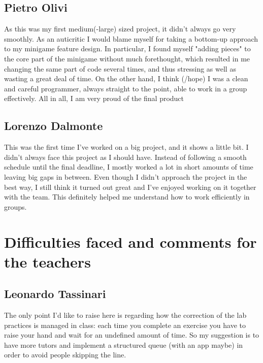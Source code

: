 \documentclass[a4paper,12pt]{report}
\begin{document}
\subsection*{Pietro Olivi}
As this was my first medium(-large) sized project, it didn't always go very smoothly. As an auticritic I would blame myself for taking a bottom-up approach to my minigame 
feature design. In particular, I found myself "adding pieces" to the core part of the minigame without much forethought, which resulted in me changing the same part 
of code several times, and thus stressing as well as wasting a great deal of time. On the other hand, I think (/hope) I was a clean and careful programmer, always 
straight to the point, able to work in a group effectively. All in all, I am very proud of the final product
\pagebreak
\subsection*{Lorenzo Dalmonte}
This was the first time I've worked on a big project, and it shows a little bit. I didn't always face this project as I should have. Instead of following a smooth schedule
until the final deadline, I mostly worked a lot in short amounts of time leaving big gaps in between. Even though I didn't approach the project in the best way, I still think
it turned out great and I've enjoyed working on it together with the team. This definitely helped me understand how to work efficiently in groups.

\section{Difficulties faced and comments for the teachers}
\subsection*{Leonardo Tassinari}
The only point I'd like to raise here is regarding how the correction of the lab practices is managed in class: each time you complete an exercise you have to raise your hand and wait for an undefined amount of time.
So my suggestion is to have more tutors and implement a structured queue (with an app maybe) in order to avoid people skipping the line.
\end{document}

